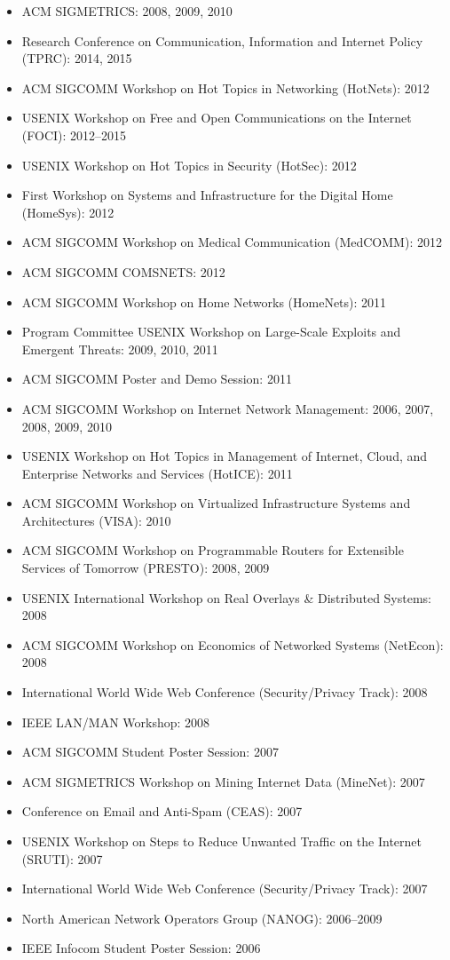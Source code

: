 \documentclass{article}
\begin{document}
\begin{cv}{}
\begin{itemize}
\item
ACM SIGMETRICS: 2008, 2009, 2010
\item
Research Conference on Communication, Information and Internet Policy
(TPRC): 2014, 2015
\item
ACM SIGCOMM Workshop on Hot Topics in Networking (HotNets): 2012
\item
USENIX Workshop on Free and Open Communications on the Internet (FOCI):
 2012--2015
\item USENIX Workshop on Hot Topics in Security (HotSec): 2012
\item First Workshop on Systems and Infrastructure for the Digital Home (HomeSys): 2012
\item ACM SIGCOMM Workshop on Medical Communication (MedCOMM): 2012
\item ACM SIGCOMM COMSNETS: 2012
\item ACM SIGCOMM Workshop on Home Networks (HomeNets): 2011
\item Program Committee USENIX Workshop on Large-Scale Exploits and Emergent Threats: 2009, 2010, 2011
\item ACM SIGCOMM Poster and Demo Session: 2011
\item ACM SIGCOMM Workshop on Internet Network Management: 2006, 2007, 2008, 2009, 2010
\item USENIX Workshop on Hot Topics in Management of Internet, Cloud, and Enterprise Networks and Services (HotICE): 2011
\item ACM SIGCOMM Workshop on Virtualized Infrastructure Systems and Architectures (VISA): 2010
\item ACM SIGCOMM Workshop on Programmable Routers for Extensible Services of Tomorrow (PRESTO): 2008, 2009

\item USENIX International Workshop on Real Overlays \& Distributed Systems: 2008

\item ACM SIGCOMM Workshop on Economics of Networked Systems (NetEcon): 2008

\item International World Wide Web Conference (Security/Privacy Track): 2008
\item IEEE LAN/MAN Workshop: 2008
\item ACM SIGCOMM Student Poster Session: 2007
\item ACM SIGMETRICS Workshop on Mining Internet Data (MineNet): 2007
\item Conference on Email and Anti-Spam (CEAS): 2007
\item USENIX Workshop on Steps to Reduce Unwanted Traffic on the Internet (SRUTI): 2007
\item International World Wide Web Conference (Security/Privacy Track): 2007
\item North American Network Operators Group (NANOG): 2006--2009
\item IEEE Infocom Student Poster Session: 2006


\end{itemize}
\end{cv}
\end{document}
